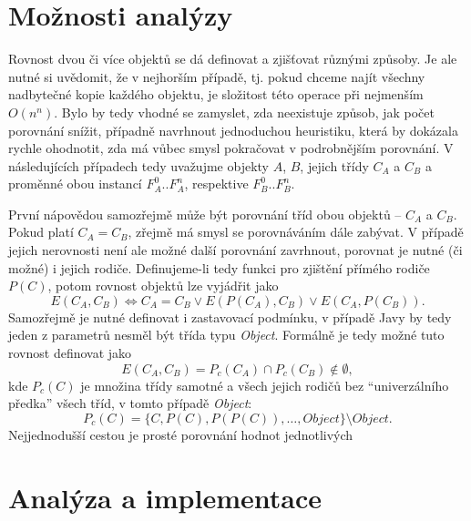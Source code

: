 \chapter{Možnosti analýzy}
Rovnost dvou či více objektů se dá definovat a zjišťovat různými způsoby. Je ale nutné si uvědomit, že v nejhorším případě, tj. pokud chceme najít všechny nadbytečné kopie každého objektu, je složitost této operace při nejmenším $O(n^n)$. Bylo by tedy vhodné se zamyslet, zda neexistuje způsob, jak počet porovnání snížit, případně navrhnout jednoduchou heuristiku, která by dokázala rychle ohodnotit, zda má vůbec smysl pokračovat v podrobnějším porovnání. V následujících případech tedy uvažujme objekty $A$, $B$, jejich třídy $C_A$ a $C_B$ a proměnné obou instancí $F_A^0..F_A^n$, respektive $F_B^0..F_B^n$.

První nápovědou samozřejmě může být porovnání tříd obou objektů -- $C_A$ a $C_B$. Pokud platí $C_A = C_B$, zřejmě má smysl se porovnáváním dále zabývat. V případě jejich nerovnosti není ale možné další porovnání zavrhnout, porovnat je nutné (či možné) i jejich rodiče. Definujeme-li tedy funkci pro zjištění přímého rodiče $P(C)$, potom rovnost objektů lze vyjádřit jako
    $$ E(C_A, C_B) \Leftrightarrow C_A = C_B \vee E(P(C_A), C_B) \vee E(C_A, P(C_B)).$$    
Samozřejmě je nutné definovat i zastavovací podmínku, v případě Javy by tedy jeden z parametrů nesměl být třída typu \textit{Object}. Formálně je tedy možné tuto rovnost definovat jako
	$$ E(C_A, C_B) = P_c(C_A) \cap P_c(C_B) \notin \emptyset,$$
kde $P_c(C)$ je množina třídy samotné a všech jejich rodičů bez “univerzálního předka” všech tříd, v tomto případě \textit{Object}:
	$$ P_c(C) = \{C, P(C), P(P(C)), \dots, Object\} \setminus Object. $$
Nejjednodušší cestou je prosté porovnání hodnot jednotlivých


\chapter{Analýza a implementace}
